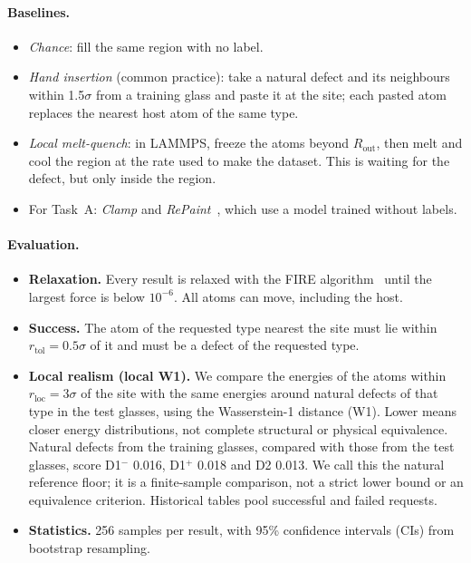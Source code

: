 \documentclass[10pt]{article}
\newcommand{\Dm}{D1$^{-}$}
\newcommand{\Dp}{D1$^{+}$}
\begin{document}
\paragraph{Baselines.}
\begin{itemize}
\item \emph{Chance}: fill the same region with no label.
\item \emph{Hand insertion} (common practice): take a natural defect and its neighbours within 1.5$\sigma$ from a training glass and paste it at the site; each pasted atom replaces the nearest host atom of the same type.
\item \emph{Local melt-quench}: in LAMMPS, freeze the atoms beyond $R_\text{out}$, then melt and cool the region at the rate used to make the dataset. This is waiting for the defect, but only inside the region.
\item For Task~A: \emph{Clamp} and \emph{RePaint}~\citep{lugmayr2022repaint}, which use a model trained without labels.
\end{itemize}

\paragraph{Evaluation.}
\begin{itemize}
\item \textbf{Relaxation.} Every result is relaxed with the FIRE algorithm~\citep{bitzek2006fire} until the largest force is below $10^{-6}$. All atoms can move, including the host.
\item \textbf{Success.} The atom of the requested type nearest the site must lie within $r_\text{tol}=0.5\sigma$ of it and must be a defect of the requested type.
\item \textbf{Local realism (local W1).} We compare the energies of the atoms within $r_\text{loc}=3\sigma$ of the site with the same energies around natural defects of that type in the test glasses, using the Wasserstein-1 distance (W1). Lower means closer energy distributions, not complete structural or physical equivalence. Natural defects from the training glasses, compared with those from the test glasses, score \Dm{} 0.016, \Dp{} 0.018 and D2 0.013. We call this the natural reference floor; it is a finite-sample comparison, not a strict lower bound or an equivalence criterion. Historical tables pool successful and failed requests.
\item \textbf{Statistics.} 256 samples per result, with 95\% confidence intervals (CIs) from bootstrap resampling.
\end{itemize}
\end{document}
